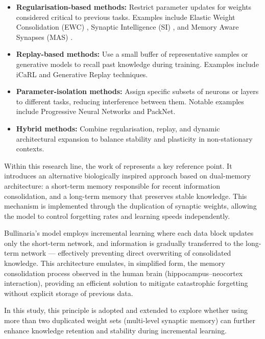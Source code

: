 \begin{itemize}
    \item \textbf{Regularisation-based methods:}  
    Restrict parameter updates for weights considered critical to previous tasks.  
    Examples include Elastic Weight Consolidation (EWC) \cite{kirkpatrick2017overcoming}, 
    Synaptic Intelligence (SI) \cite{zenke2017continual}, and Memory Aware Synapses 
    (MAS) \cite{aljundi2018mas}.

    \item \textbf{Replay-based methods:}  
    Use a small buffer of representative samples or generative models to recall past knowledge during training.  
    Examples include iCaRL and Generative Replay techniques.

    \item \textbf{Parameter-isolation methods:}  
    Assign specific subsets of neurons or layers to different tasks, reducing interference between them.  
    Notable examples include Progressive Neural Networks and PackNet.

    \item \textbf{Hybrid methods:}  
    Combine regularisation, replay, and dynamic architectural expansion to balance stability and plasticity in non-stationary contexts.
\end{itemize}

Within this research line, the work of \cite{bullinaria2009} represents a key reference point.  
It introduces an alternative biologically inspired approach based on dual-memory architecture: a short-term memory responsible for recent information consolidation, and a long-term memory that preserves stable knowledge.  
This mechanism is implemented through the duplication of synaptic weights, allowing the model to control forgetting rates and learning speeds independently.

Bullinaria’s model employs incremental learning where each data block updates only the short-term network, and information is gradually transferred to the long-term network — effectively preventing direct overwriting of consolidated knowledge.  
This architecture emulates, in simplified form, the memory consolidation process observed in the human brain (hippocampus–neocortex interaction), providing an efficient solution to mitigate catastrophic forgetting without explicit storage of previous data.

In this study, this principle is adopted and extended to explore whether using more than two duplicated weight sets (multi-level synaptic memory) can further enhance knowledge retention and stability during incremental learning.

